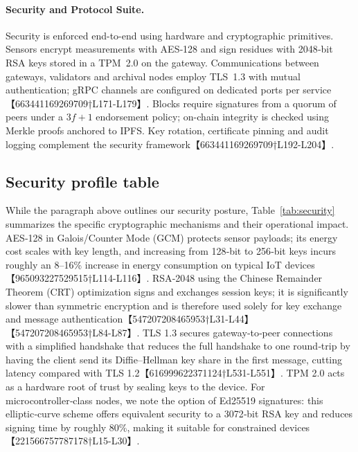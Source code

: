 \documentclass[12pt,onecolumn]{IEEEtran} %
\begin{document}
\paragraph{Security and Protocol Suite.}  Security is enforced end-to-end using hardware and cryptographic primitives.  Sensors encrypt measurements with AES‑128 and sign residues with 2048‑bit RSA keys stored in a TPM~2.0 on the gateway.  Communications between gateways, validators and archival nodes employ TLS~1.3 with mutual authentication; gRPC channels are configured on dedicated ports per service【663441169269709†L171-L179】.  Blocks require signatures from a quorum of peers under a $3f+1$ endorsement policy; on-chain integrity is checked using Merkle proofs anchored to IPFS.  Key rotation, certificate pinning and audit logging complement the security framework【663441169269709†L192-L204】.

\subsection{Security profile table}
While the paragraph above outlines our security posture, Table~\ref{tab:security} summarizes the specific cryptographic mechanisms and their operational impact.  AES‑128 in Galois/Counter Mode (GCM) protects sensor payloads; its energy cost scales with key length, and increasing from 128‑bit to 256‑bit keys incurs roughly an 8–16\% increase in energy consumption on typical IoT devices【965093227529515†L114-L116】.  RSA‑2048 using the Chinese Remainder Theorem (CRT) optimization signs and exchanges session keys; it is significantly slower than symmetric encryption and is therefore used solely for key exchange and message authentication【547207208465953†L31-L44】【547207208465953†L84-L87】.  TLS 1.3 secures gateway‑to‑peer connections with a simplified handshake that reduces the full handshake to one round‑trip by having the client send its Diffie–Hellman key share in the first message, cutting latency compared with TLS 1.2【616999622371124†L531-L551】.  TPM 2.0 acts as a hardware root of trust by sealing keys to the device.  For microcontroller‑class nodes, we note the option of Ed25519 signatures: this elliptic‑curve scheme offers equivalent security to a 3072‑bit RSA key and reduces signing time by roughly 80\%, making it suitable for constrained devices【221566757787178†L15-L30】.
\end{document}
